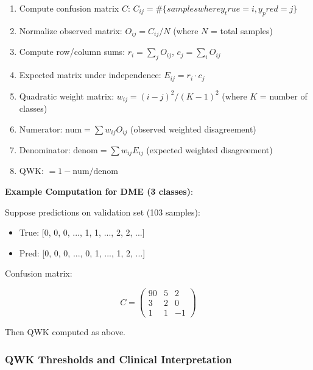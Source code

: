 \begin{enumerate}
    \item Compute confusion matrix $C$: $C_{ij} = \#\{samples where y_true=i, y_pred=j\}$
    
    \item Normalize observed matrix: $O_{ij} = C_{ij} / N$ (where $N$ = total samples)
    
    \item Compute row/column sums: $r_i = \sum_j O_{ij}$, $c_j = \sum_i O_{ij}$
    
    \item Expected matrix under independence: $E_{ij} = r_i \cdot c_j$
    
    \item Quadratic weight matrix: $w_{ij} = (i-j)^2 / (K-1)^2$ (where $K$ = number of classes)
    
    \item Numerator: $\text{num} = \sum w_{ij} O_{ij}$ (observed weighted disagreement)
    
    \item Denominator: $\text{denom} = \sum w_{ij} E_{ij}$ (expected weighted disagreement)
    
    \item QWK: $= 1 - \text{num} / \text{denom}$
\end{enumerate}

\textbf{Example Computation for DME (3 classes)}:

Suppose predictions on validation set (103 samples):

\begin{itemize}
    \item True: [0, 0, 0, ..., 1, 1, ..., 2, 2, ...]
    \item Pred: [0, 0, 0, ..., 0, 1, ..., 1, 2, ...]
\end{itemize}

Confusion matrix:

\begin{equation}
C = \begin{pmatrix}
90 & 5 & 2 \\
3 & 2 & 0 \\
1 & 1 & -1
\end{pmatrix}
\end{equation}

Then QWK computed as above.

\subsubsection{QWK Thresholds and Clinical Interpretation}

